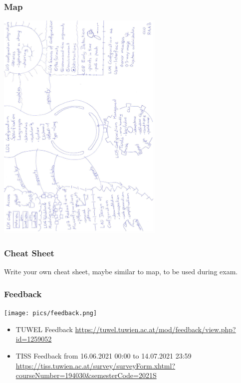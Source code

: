 \begin{frame}
	\frametitle{Map}

	\vspace{-0.5cm}
	\includegraphics[width=8cm,angle=-90]{pics/map.pdf}
\end{frame}

\begin{assignment}
	\frametitle{Cheat Sheet}
	\begin{task}
	Write your own cheat sheet, maybe similar to map, to be used during exam.
	\end{task}
\end{assignment}

\begin{frame}
	\frametitle{Feedback}
	\hfill \texttt{[image: pics/feedback.png]}
	\vspace{-1cm}
	\begin{itemize}
		\item TUWEL Feedback \linebreak
		{\scriptsize \url{https://tuwel.tuwien.ac.at/mod/feedback/view.php?id=1259052}}
		\vspace{0.2cm}
		\item TISS Feedback \linebreak
		{\small from 16.06.2021 00:00 to 14.07.2021 23:59
		\scriptsize \url{https://tiss.tuwien.ac.at/survey/surveyForm.xhtml?courseNumber=194030&semesterCode=2021S}}
	\end{itemize}
\end{frame}

